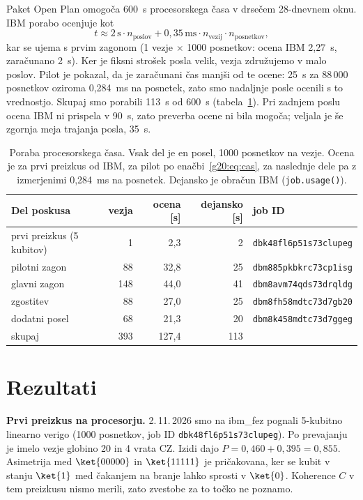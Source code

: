 Paket Open Plan omogoča 600~s procesorskega časa v drsečem 28-dnevnem oknu. IBM porabo ocenjuje kot~\cite{g20:ibmjobtime}
\begin{equation}
t \approx 2\,\mathrm{s}\cdot n_\text{poslov} + 0{,}35\,\mathrm{ms}\cdot n_\text{vezij}\cdot n_\text{posnetkov},
\label{g20:eq:cas}
\end{equation}
kar se ujema s prvim zagonom (1 vezje $\times$ 1000 posnetkov: ocena IBM 2,27~s, zaračunano 2~s). Ker je fiksni strošek posla
velik, vezja združujemo v malo poslov. Pilot je pokazal, da je zaračunani čas manjši od te ocene: 25~s za 88\,000 posnetkov oziroma
0,284~ms na posnetek, zato smo nadaljnje posle ocenili s to vrednostjo. Skupaj smo porabili 113~s od 600~s
(tabela~\ref{g20:tab:cas}). Pri zadnjem poslu ocena IBM ni prispela v 90~s, zato preverba ocene ni bila mogoča; veljala je še zgornja
meja trajanja posla, 35~s.

\begin{table}[htbp]
\caption{Poraba procesorskega časa. Vsak del je en posel, 1000 posnetkov na vezje. Ocena je za prvi preizkus od IBM, za pilot po enačbi~\eqref{g20:eq:cas}, za naslednje dele pa z izmerjenimi 0,284~ms na posnetek. Dejansko je obračun IBM (\texttt{job.usage()}).}
\label{g20:tab:cas}
\centering
\begin{tabular}{lrrrl}
\toprule
Del poskusa & vezja & ocena [s] & dejansko [s] & job ID \\
\midrule
prvi preizkus (5 kubitov) & 1 & 2,3 & 2 & \texttt{\footnotesize dbk48fl6p51s73clupeg} \\
pilotni zagon & 88 & 32,8 & 25 & \texttt{\footnotesize dbm885pkbkrc73cp1isg} \\
glavni zagon & 148 & 44,0 & 41 & \texttt{\footnotesize dbm8avm74qds73drqldg} \\
zgostitev & 88 & 27,0 & 25 & \texttt{\footnotesize dbm8fh58mdtc73d7gb20} \\
dodatni posel & 68 & 21,3 & 20 & \texttt{\footnotesize dbm8k458mdtc73d7ggeg} \\
\midrule
skupaj & 393 & 127,4 & 113 & \\
\bottomrule
\end{tabular}
\end{table}



\section{Rezultati}
\label{g20:sec:rezultati}

\textbf{Prvi preizkus na procesorju.} 2.\,11.\,2026 smo na ibm\_fez pognali 5-kubitno linearno verigo
(1000 posnetkov, job ID \texttt{dbk48fl6p51s73clupeg}). Po prevajanju je imelo vezje globino 20 in 4 vrata CZ. Izidi dajo
$P = 0{,}460 + 0{,}395 = 0{,}855$. Asimetrija med $\ket{00000}$ in $\ket{11111}$ je
pričakovana, ker se kubit v stanju $\ket{1}$ med čakanjem na branje lahko sprosti v $\ket{0}$. Koherence $C$ v tem preizkusu
nismo merili, zato zvestobe za to točko ne poznamo.



